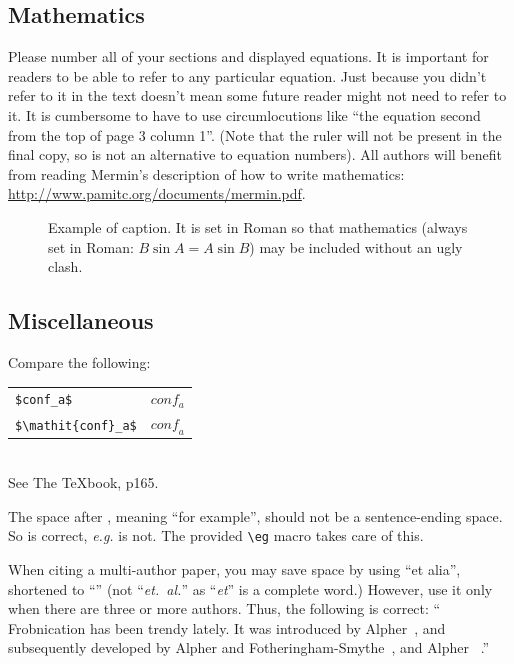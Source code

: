\documentclass[10pt,twocolumn,letterpaper]{article}
\begin{document}
\subsection{Mathematics}

Please number all of your sections and displayed equations.  It is
important for readers to be able to refer to any particular equation.  Just
because you didn't refer to it in the text doesn't mean some future reader
might not need to refer to it.  It is cumbersome to have to use
circumlocutions like ``the equation second from the top of page 3 column
1''.  (Note that the ruler will not be present in the final copy, so is not
an alternative to equation numbers).  All authors will benefit from reading
Mermin's description of how to write mathematics:
\url{http://www.pamitc.org/documents/mermin.pdf}.




\begin{figure}[t]
\begin{center}
\fbox{\rule{0pt}{2in} \rule{0.9\linewidth}{0pt}}
\end{center}
   \caption{Example of caption.  It is set in Roman so that mathematics
   (always set in Roman: $B \sin A = A \sin B$) may be included without an
   ugly clash.}
\label{fig:long}
\label{fig:onecol}
\end{figure}

\subsection{Miscellaneous}

\noindent
Compare the following:\\
\begin{tabular}{ll}
 \verb'$conf_a$' &  $conf_a$ \\
 \verb'$\mathit{conf}_a$' & $\mathit{conf}_a$
\end{tabular}\\
See The \TeX book, p165.

The space after \eg, meaning ``for example'', should not be a
sentence-ending space. So \eg is correct, {\em e.g.} is not.  The provided
\verb'\eg' macro takes care of this.

When citing a multi-author paper, you may save space by using ``et alia'',
shortened to ``\etal'' (not ``{\em et.\ al.}'' as ``{\em et}'' is a complete word.)
However, use it only when there are three or more authors.  Thus, the
following is correct: ``
   Frobnication has been trendy lately.
   It was introduced by Alpher~\cite{Alpher02}, and subsequently developed by
   Alpher and Fotheringham-Smythe~\cite{Alpher03}, and Alpher \etal~\cite{Alpher04}.''
\end{document}
